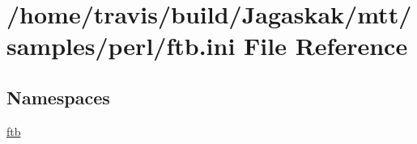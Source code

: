 \hypertarget{ftb_8ini}{\section{/home/travis/build/\-Jagaskak/mtt/samples/perl/ftb.ini File Reference}
\label{ftb_8ini}
}
\subsection*{Namespaces}
\begin{DoxyCompactItemize}
\item 
\hyperlink{namespaceftb}{ftb}
\end{DoxyCompactItemize}
